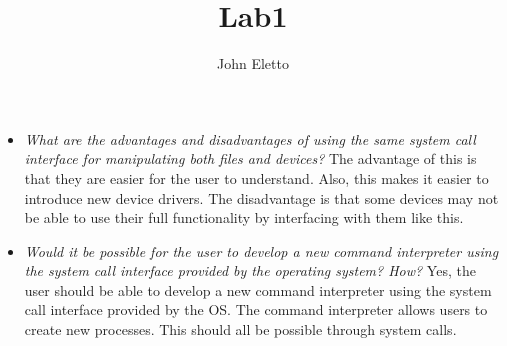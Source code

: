 \documentclass{article}
\begin{document}
\title{Lab1}
\author{John Eletto}
\maketitle

\begin{itemize}
	\item \textit{What are the advantages and disadvantages of using the same system call interface for manipulating both files and devices?}
	\newline
	\newline
	The advantage of this is that they are easier for the user to understand. Also, this makes it easier to introduce new device drivers. The disadvantage is that some devices may not be able to use their full functionality by interfacing with them like this.
	
	\item \textit{Would it be possible for the user to develop a new command interpreter using the system call interface provided by the operating system? How?}
	\newline
	\newline
	Yes, the user should be able to develop a new command interpreter using the system call interface provided by the OS. The command interpreter allows users to create new processes. This should all be possible through system calls.
\end{itemize}
\end{document}
